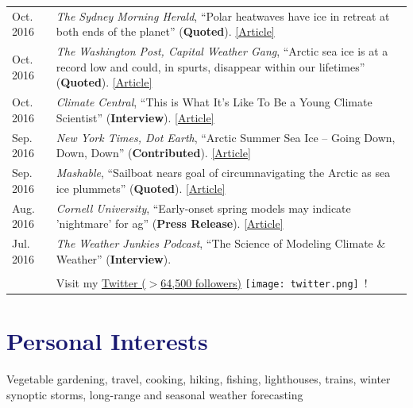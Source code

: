 \documentclass[margin,line,palatino,courier,10pt]{res}
\begin{document}
\begin{resume}
\begin{tabular}{@{}p{0.9in}p{4in}}
Oct. 2016 & \textit{The Sydney Morning Herald}, ``Polar heatwaves have ice in retreat at both ends of the planet'' (\textbf{Quoted}). \href{http://www.smh.com.au/environment/climate-change/polar-heatwaves-have-ice-in-retreat-at-both-ends-of-the-planet-20161030-gse9q6.html}{[Article]}\\
Oct. 2016 & \textit{The Washington Post, Capital Weather Gang}, ``Arctic sea ice is at a record low and could, in spurts, disappear within our lifetimes'' (\textbf{Quoted}). \href{https://www.washingtonpost.com/news/capital-weather-gang/wp/2016/10/27/arctic-sea-ice-is-at-a-record-low-and-could-in-spurts-disappear-within-our-lifetimes/}{[Article]}\\
Oct. 2016 & \textit{Climate Central}, ``This is What It's Like To Be a Young Climate Scientist'' (\textbf{Interview}). \href{http://www.climatecentral.org/news/young-climate-scientists-interviews-20799}{[Article]}\\
Sep. 2016 & \textit{New York Times, Dot Earth}, ``Arctic Summer Sea Ice -- Going Down, Down, Down'' (\textbf{Contributed}). \href{http://dotearth.blogs.nytimes.com/2016/09/16/arctic-summer-sea-ice-going-down-down-down/?module=BlogPost-ReadMore&version=Blog\%20Main&action=Click&contentCollection=arctic&pgtype=Blogs&region=Body&_r=1#more-58318}{[Article]}\\
Sep. 2016 & \textit{Mashable}, ``Sailboat nears goal of circumnavigating the Arctic as sea ice plummets'' (\textbf{Quoted}). \href{http://mashable.com/2016/09/01/sailboat-arctic-ice-melt-open-water/#s7nzft8m6sqB}{[Article]}\\
Aug. 2016 & \textit{Cornell University}, ``Early-onset spring models may indicate 'nightmare' for ag'' (\textbf{Press Release}). \href{http://www.news.cornell.edu/stories/2016/08/early-onset-spring-models-may-indicate-nightmare-ag}{[Article]}\\
Jul. 2016 & \textit{The Weather Junkies Podcast}, ``The Science of Modeling Climate \& Weather'' (\textbf{Interview}). \\\\

& Visit my \href{https://twitter.com/ZLabe}{Twitter ($>$64,500 followers)} \texttt{[image: twitter.png]}\ !\\
\end{tabular}

\vspace{-0.1in}
\noindent\textcolor{MidnightBlue}{\makebox[\linewidth][r]{\rule{\textwidth}{5pt}}}
\vspace{-0.3in}
\section{\sc \textcolor{MidnightBlue}{\large{\textbf{Personal Interests}}}}
Vegetable gardening, travel, cooking, hiking, fishing, lighthouses, trains, winter synoptic storms, long-range and seasonal weather forecasting

\end{resume}
\end{document}
